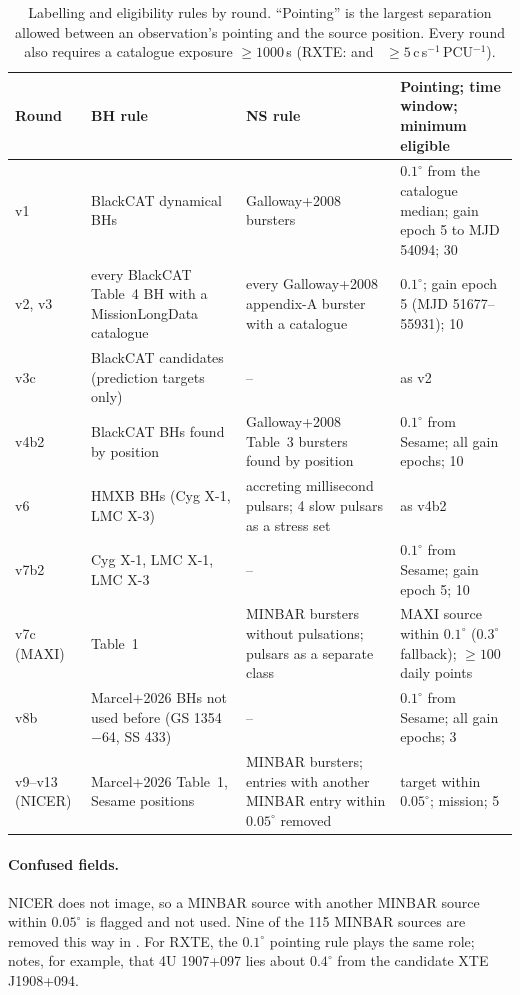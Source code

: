 \begin{table}[htbp]
\centering\small
\caption{Labelling and eligibility rules by round. ``Pointing'' is the largest separation allowed between an observation's
pointing and the source position. Every round also requires a catalogue exposure $\ge1000$\,s (RXTE: and
~$\ge5$\,c\,s$^{-1}$\,PCU$^{-1}$).}\label{tab:labelrules}
\begin{tabularx}{\textwidth}{@{}>{\raggedright\arraybackslash}p{1.35cm}>{\raggedright\arraybackslash}X>{\raggedright\arraybackslash}X>{\raggedright\arraybackslash}p{3.9cm}@{}}
\toprule
Round & BH rule & NS rule & Pointing; time window; minimum eligible \\
\midrule
v1 & 4 BlackCAT dynamical BHs & 4 Galloway+2008 bursters & $0.1^\circ$ from the catalogue median; gain epoch 5 to MJD 54094; 30 \\
v2, v3 & every BlackCAT Table~4 BH with a MissionLongData catalogue & every Galloway+2008 appendix-A burster with a catalogue & $0.1^\circ$; gain epoch 5 (MJD 51677--55931); 10 \\
v3c & 16 BlackCAT candidates (prediction targets only) & -- & as v2 \\
v4b2 & BlackCAT BHs found by position & Galloway+2008 Table~3 bursters found by position & $0.1^\circ$ from Sesame; all gain epochs; 10 \\
v6 & HMXB BHs (Cyg X-1, LMC X-3) & accreting millisecond pulsars; 4 slow pulsars as a stress set & as v4b2 \\
v7b2 & Cyg X-1, LMC X-1, LMC X-3 \citep{Marcel2026} & -- & $0.1^\circ$ from Sesame; gain epoch 5; 10 \\
v7c (MAXI) & \citet{Marcel2026} Table~1 & MINBAR bursters without pulsations; pulsars as a separate class & MAXI source within $0.1^\circ$ ($0.3^\circ$ fallback); $\ge100$ daily points \\
v8b & Marcel+2026 BHs not used before (GS 1354$-$64, SS 433) & -- & $0.1^\circ$ from Sesame; all gain epochs; 3 \\
v9--v13 (NICER) & Marcel+2026 Table~1, Sesame positions & MINBAR bursters; entries with another MINBAR entry within $0.05^\circ$ removed & target within $0.05^\circ$; mission; 5 \\
\bottomrule
\end{tabularx}
\end{table}

\paragraph{Confused fields.} NICER does not image, so a MINBAR source with another MINBAR source within $0.05^\circ$ is
flagged  and not used. Nine of the 115 MINBAR sources are removed this way in .
For RXTE, the $0.1^\circ$ pointing rule plays the same role;  notes, for example, that 4U 1907+097 lies
about $0.4^\circ$ from the candidate XTE J1908+094.

